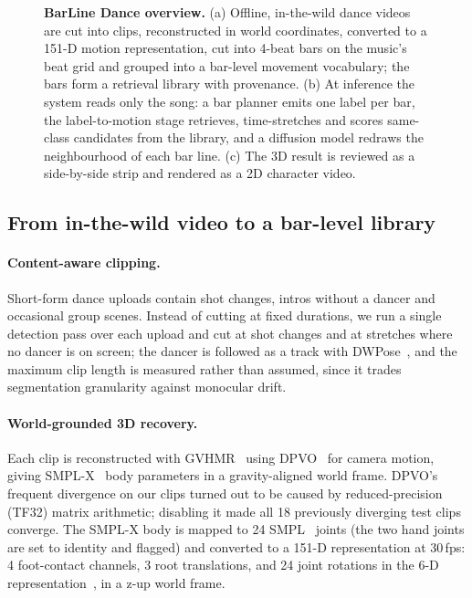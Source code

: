 \documentclass[10pt]{article}
\begin{document}
\begin{figure}[t]
  \centering
  \resizebox{\linewidth}{!}{}
  \caption{\textbf{BarLine Dance overview.} (a) Offline, in-the-wild dance videos are cut into clips, reconstructed in world coordinates, converted to a 151-D motion representation, cut into 4-beat bars on the music's beat grid and grouped into a bar-level movement vocabulary; the bars form a retrieval library with provenance. (b) At inference the system reads only the song: a bar planner emits one label per bar, the label-to-motion stage retrieves, time-stretches and scores same-class candidates from the library, and a diffusion model redraws the neighbourhood of each bar line. (c) The 3D result is reviewed as a side-by-side strip and rendered as a 2D character video.}
  \label{fig:arch}
\end{figure}

\subsection{From in-the-wild video to a bar-level library}
\label{sec:corpus}

\paragraph{Content-aware clipping.}
Short-form dance uploads contain shot changes, intros without a dancer and occasional group scenes.
Instead of cutting at fixed durations, we run a single detection pass over each upload and cut at shot changes and at stretches where no dancer is on screen; the dancer is followed as a track with DWPose~\cite{yang2023dwpose}, and the maximum clip length is measured rather than assumed, since it trades segmentation granularity against monocular drift.

\paragraph{World-grounded 3D recovery.}
Each clip is reconstructed with GVHMR~\cite{shen2024gvhmr} using DPVO~\cite{teed2023dpvo} for camera motion, giving SMPL-X~\cite{pavlakos2019smplx} body parameters in a gravity-aligned world frame.
DPVO's frequent divergence on our clips turned out to be caused by reduced-precision (TF32) matrix arithmetic; disabling it made all 18 previously diverging test clips converge.
The SMPL-X body is mapped to 24 SMPL~\cite{loper2015smpl} joints (the two hand joints are set to identity and flagged) and converted to a 151-D representation at 30\,fps: 4 foot-contact channels, 3 root translations, and 24 joint rotations in the 6-D representation~\cite{zhou2019rot6d}, in a z-up world frame.
\end{document}

